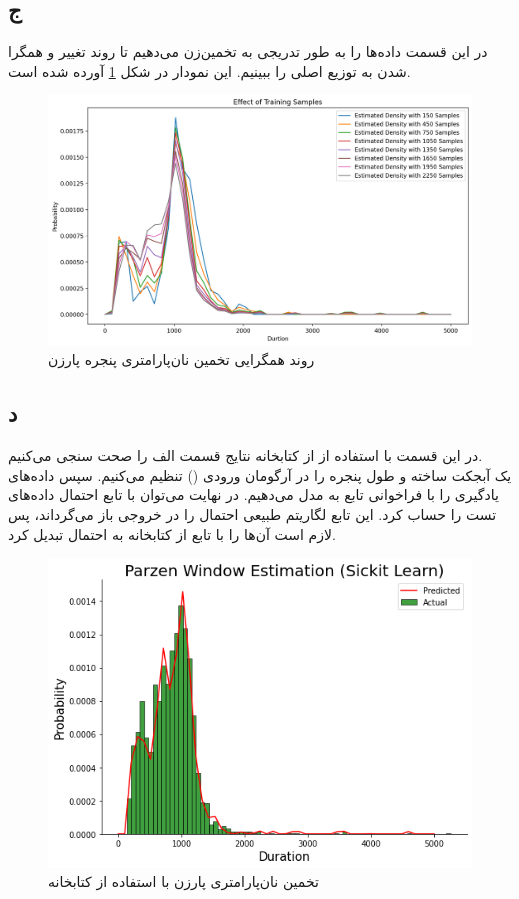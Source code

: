 \documentclass[12pt,onecolumn,a4paper]{article}
\begin{document}
\subsection*{ج}
در این قسمت داده‌ها را به طور تدریجی به تخمین‌زن می‌دهیم تا  روند تغییر و همگرا شدن به توزیع اصلی را ببینیم. این نمودار در شکل \ref{fig:7} آورده شده است.
\begin{figure}[h!]
    \begin{center}
    \includegraphics[scale=0.5]{q8/Q8_c.png}
    \caption{روند همگرایی تخمین نان‌پارامتری پنجره پارزن }
    \label{fig:7}
    \end{center}
\end{figure}

\subsection*{د}
در این قسمت با استفاده از  از کتابخانه  نتایج قسمت الف را صحت سنجی می‌کنیم. \\
یک آبجکت  ساخته و طول پنجره را در آرگومان ورودی () تنظیم می‌کنیم. سپس داده‌های یادگیری را با فراخوانی تابع  به مدل می‌دهیم. در نهایت می‌توان با تابع  احتمال داده‌های تست را حساب کرد. این تابع لگاریتم طبیعی احتمال را در خروجی باز می‌گرداند، پس لازم است آن‌ها را با تابع  از کتابخانه  به احتمال تبدیل کرد.

\begin{figure}[h!]
    \begin{center}
    \includegraphics[scale=0.5]{q8/Q8_d.png}
    \caption{تخمین نان‌پارامتری پارزن با استفاده از کتابخانه }
    \label{fig:8}
    \end{center}
\end{figure}
\end{document}
